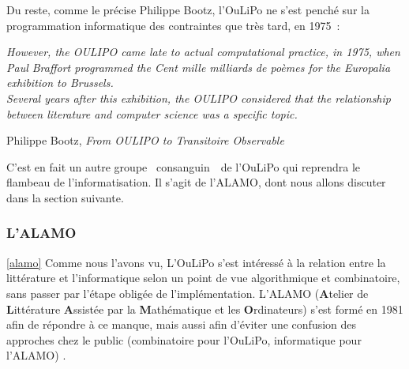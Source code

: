 \documentclass{article}
\newenvironment{citationbox}
{\begin{center}
		\begin{minipage}{.8\textwidth}
		}
		{
		\end{minipage}	
\end{center}
}
\begin{document}
					Du reste, comme le précise Philippe Bootz, l'OuLiPo ne s'est penché sur la programmation informatique des contraintes que très tard, en 1975~:
					\begin{citationbox}
						\textit{However, the OULIPO came late to actual computational practice, in 1975, when Paul Braffort programmed the Cent mille milliards de poèmes for the Europalia exhibition to Brussels.\\
						Several years after this exhibition, the OULIPO considered that the relationship between literature and computer science was a specific topic.}
						\begin{flushright}
							Philippe Bootz, \textit{From OULIPO to Transitoire Observable} \autocite{bootz2012}
						\end{flushright}
					\end{citationbox}
					C'est en fait un autre groupe \guillemotleft~consanguin~\guillemotright~de l'OuLiPo qui reprendra le flambeau de l'informatisation. Il s'agit de l'ALAMO, dont nous allons discuter dans la section suivante.
				
				
				
			\subsubsection{L'ALAMO}\ref{alamo}
				Comme nous l'avons vu, L'OuLiPo s'est intéressé à la relation entre la littérature et l'informatique selon un point de vue algorithmique et combinatoire, sans passer par l'étape obligée de l'implémentation. L'ALAMO (\textbf{A}telier de \textbf{L}ittérature \textbf{A}ssistée par la \textbf{M}athématique et les \textbf{O}rdinateurs) s'est formé en 1981 afin de répondre à ce manque, mais aussi afin d'éviter une confusion des approches chez le public (combinatoire pour l'OuLiPo, informatique pour l'ALAMO) \autocite{alamo}.\\
				
\end{document}
